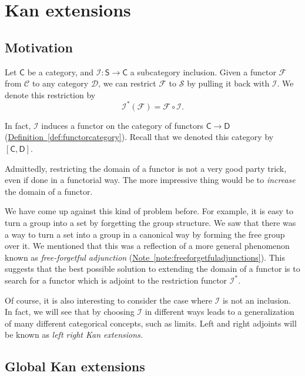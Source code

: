 \documentclass[notes.tex]{subfiles}
\begin{document}
\chapter{Kan extensions}\label{sec:kan_extensions}

\section{Motivation}
\label{sec:motivation}

Let $\mathsf{C}$ be a category, and $\mathcal{I}\colon \mathsf{S} \to \mathsf{C}$ a subcategory inclusion. Given a functor $\mathcal{F}$ from $\mathcal{C}$ to any category $\mathcal{D}$, we can restrict $\mathcal{F}$ to $\mathcal{S}$ by pulling it back with $\mathcal{I}$. We denote this restriction by
\begin{equation*}
  \mathcal{I}^{*}(\mathcal{F}) = \mathcal{F} \circ \mathcal{I}.
\end{equation*}

In fact, $\mathcal{I}$ induces a functor on the category of functors $\mathsf{C} \to \mathsf{D}$ (\hyperref[def:functorcategory]{Definition~\ref*{def:functorcategory}}). Recall that we denoted this category by $[\mathsf{C}, \mathsf{D}]$. 

Admittedly, restricting the domain of a functor is not a very good party trick, even if done in a functorial way. The more impressive thing would be to \emph{increase} the domain of a functor. 

We have come up against this kind of problem before. For example, it is easy to turn a group into a set by forgetting the group structure. We saw that there was a way to turn a set into a group in a canonical way by forming the free group over it. We mentioned that this was a reflection of a more general phenomenon known as \emph{free-forgetful adjunction} (\hyperref[note:freeforgetfuladjunctions]{Note~\ref*{note:freeforgetfuladjunctions}}). This suggests that the best possible solution to extending the domain of a functor is to search for a functor which is adjoint to the restriction functor $\mathcal{I}^{*}$.

Of course, it is also interesting to consider the case where $\mathcal{I}$ is not an inclusion. In fact, we will see that by choosing $\mathcal{I}$ in different ways leads to a generalization of many different categorical concepts, such as limits. Left and right adjoints will be known as \emph{left right Kan extensions.}

\section{Global Kan extensions}
\label{sec:global_kan_extensions}
\end{document}
